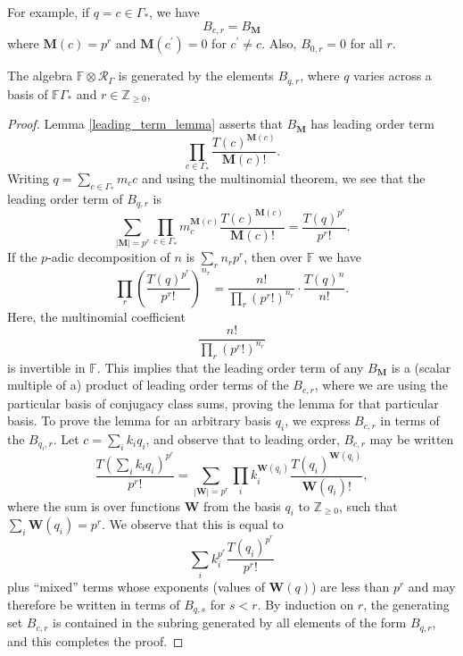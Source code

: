 \documentclass[ALCO,Unicode]{cedram}
\newcommand{\RGamma}{\mathcal{R}_{\Gamma}}
\newcommand{\RGamma}{\mathcal{R}_{\Gamma}}
\begin{document}
For example, if $q=c \in \Gamma_*$, we have
\[
B_{c,r} = B_{\mathbf{M}}
\]
where $\mathbf{M}(c) = p^r$ and $\mathbf{M}(c^\prime) = 0$ for $c^\prime \neq c$. Also, $B_{0,r} = 0$ for all $r$.

\begin{lemma} \label{rgamma_modular_generation_lemma}
The algebra $\mathbb{F} \otimes \RGamma$ is generated by the elements $B_{q,r}$, where $q$ varies across a basis of $\mathbb{F}\Gamma_*$ and $r \in \mathbb{Z}_{\geq 0}$,
\end{lemma}
\begin{proof}
Lemma \ref{leading_term_lemma} asserts that $B_{\mathbf{M}}$ has leading order term
\[
\prod_{c \in \Gamma_*} \frac{T(c)^{\mathbf{M}(c)}}{\mathbf{M}(c)!}.
\]
Writing $q = \sum_{c \in \Gamma_*} m_c c$ and using the multinomial theorem, we see that the leading order term of $B_{q,r}$ is
\[
\sum_{|\mathbf{M}| = p^r} \prod_{c \in \Gamma_*} m_c^{\mathbf{M}(c)} \frac{T(c)^{\mathbf{M}(c)}}{\mathbf{M}(c)!} = \frac{T(q)^{p^r}}{p^r!}.
\]
If the $p$-adic decomposition of $n$ is $\sum_r n_r p^r$, then over $\mathbb{F}$ we have
\[
\prod_r \left(\frac{T(q)^{p^r}}{p^r!}\right)^{n_r} = \frac{n!}{\prod_{r} (p^r!)^{n_r}} \cdot \frac{T(q)^n}{n!}.
\]
Here, the multinomial coefficient
\[
\frac{n!}{\prod_{r} (p^r!)^{n_r}}
\]
is invertible in $\mathbb{F}$. This implies that the leading order term of any $B_{\mathbf{M}}$ is a (scalar multiple of a) product of leading order terms of the $B_{c,r}$, where we are using the particular basis of conjugacy class sums, proving the lemma for that particular basis. To prove the lemma for an arbitrary basis $q_i$, we express $B_{c,r}$ in terms of the $B_{q_i,r}$. Let $c = \sum_i k_i q_i$, and observe that to leading order, $B_{c,r}$ may be written
\[
\frac{T(\sum_i k_i q_i)^{p^r}}{p^r!} = \sum_{|\mathbf{W}| = p^r} \prod_{i} k_i^{\mathbf{W}(q_i)} \frac{T(q_i)^{\mathbf{W}(q_i)}}{\mathbf{W}(q_i)!},
\]
where the sum is over functions $\mathbf{W}$ from the basis $q_i$ to $\mathbb{Z}_{\geq 0}$, such that $\sum_i \mathbf{W}(q_i) = p^r$. We observe that this is equal to
\[
\sum_i k_i^{p^r} \frac{T(q_i)^{p^r}}{p^r!}
\]
plus ``mixed'' terms whose exponents (values of $\mathbf{W}(q)$) are less than $p^r$ and may therefore be written in terms of $B_{q,s}$ for $s <r$. By induction on $r$, the generating set $B_{c,r}$ is contained in the subring generated by all elements of the form $B_{q,r}$, and this completes the proof.
\end{proof}
\end{document}
